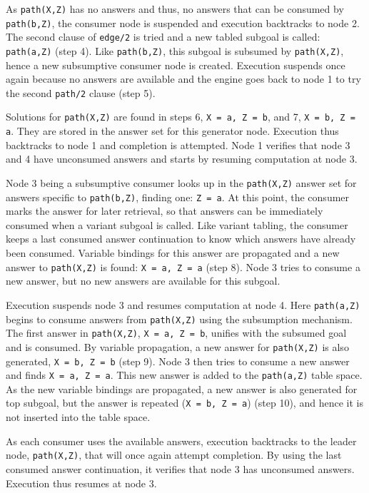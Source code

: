 As \texttt{path(X,Z)} has no answers and thus, no answers that can be consumed by \texttt{path(b,Z)}, the consumer node is suspended
and execution backtracks to node 2. The second clause of \texttt{edge/2} is tried and a new tabled subgoal is called: \texttt{path(a,Z)} (step 4).
Like \texttt{path(b,Z)}, this subgoal is subsumed by \texttt{path(X,Z)}, hence a new subsumptive consumer node is created. Execution suspends
once again because no answers are available and the engine goes back to node 1 to try the second \texttt{path/2} clause (step 5).

Solutions for \texttt{path(X,Z)} are found in steps 6, \texttt{X = a, Z = b}, and 7, \texttt{X = b, Z = a}. They are stored in the answer set
for this generator node. Execution thus backtracks to node 1 and completion is attempted. Node 1 verifies that node 3 and 4 have
unconsumed answers and starts by resuming computation at node 3.

Node 3 being a subsumptive consumer looks up in the \texttt{path(X,Z)}
answer set for answers specific to \texttt{path(b,Z)}, finding one: \texttt{Z = a}. At this point, the consumer marks the answer
for later retrieval, so that answers can be immediately consumed when a variant subgoal is called.
Like variant tabling, the consumer keeps a last consumed answer continuation to know which answers have already been consumed.
Variable bindings for this answer are propagated and a new answer to \texttt{path(X,Z)} is found: \texttt{X = a, Z = a} (step 8).
Node 3 tries to consume a new answer, but no new answers are available for this subgoal.

Execution suspends node 3 and resumes computation at node 4. Here \texttt{path(a,Z)} begins to consume answers from \texttt{path(X,Z)}
using the subsumption mechanism. The first answer in \texttt{path(X,Z)}, \texttt{X = a, Z = b}, unifies with the subsumed goal and
is consumed. By variable propagation, a new answer for \texttt{path(X,Z)} is also generated, \texttt{X = b, Z = b} (step 9).
Node 3 then tries to consume a new answer and finds \texttt{X = a, Z = a}. This new answer
is added to the \texttt{path(a,Z)} table space. As the new variable bindings are propagated, a new answer is also generated
for top subgoal, but the answer is repeated (\texttt{X = b, Z = a}) (step 10), and hence it is not inserted into the table space.

As each consumer uses the available answers, execution backtracks to the leader node, \texttt{path(X,Z)}, that will once
again attempt completion. By using the last consumed answer continuation, it verifies that node 3 has unconsumed answers.
Execution thus resumes at node 3.

